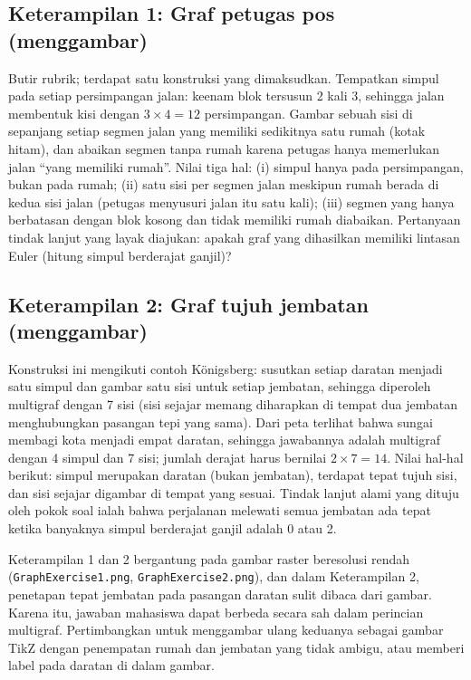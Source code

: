 \subsection*{Keterampilan 1: Graf petugas pos (menggambar)}

Butir rubrik; terdapat satu konstruksi yang dimaksudkan. Tempatkan simpul pada setiap persimpangan jalan: keenam blok tersusun 2 kali 3, sehingga jalan membentuk kisi dengan $3 \times 4 = 12$ persimpangan. Gambar sebuah sisi di sepanjang setiap segmen jalan yang memiliki sedikitnya satu rumah (kotak hitam), dan abaikan segmen tanpa rumah karena petugas hanya memerlukan jalan ``yang memiliki rumah''. Nilai tiga hal: (i) simpul hanya pada persimpangan, bukan pada rumah; (ii) satu sisi per segmen jalan meskipun rumah berada di kedua sisi jalan (petugas menyusuri jalan itu satu kali); (iii) segmen yang hanya berbatasan dengan blok kosong dan tidak memiliki rumah diabaikan. Pertanyaan tindak lanjut yang layak diajukan: apakah graf yang dihasilkan memiliki lintasan Euler (hitung simpul berderajat ganjil)?

\subsection*{Keterampilan 2: Graf tujuh jembatan (menggambar)}

Konstruksi ini mengikuti contoh K\"onigsberg: susutkan setiap daratan menjadi satu simpul dan gambar satu sisi untuk setiap jembatan, sehingga diperoleh multigraf dengan 7 sisi (sisi sejajar memang diharapkan di tempat dua jembatan menghubungkan pasangan tepi yang sama). Dari peta terlihat bahwa sungai membagi kota menjadi empat daratan, sehingga jawabannya adalah multigraf dengan 4 simpul dan 7 sisi; jumlah derajat harus bernilai $2 \times 7 = 14$. Nilai hal-hal berikut: simpul merupakan daratan (bukan jembatan), terdapat tepat tujuh sisi, dan sisi sejajar digambar di tempat yang sesuai. Tindak lanjut alami yang dituju oleh pokok soal ialah bahwa perjalanan melewati semua jembatan ada tepat ketika banyaknya simpul berderajat ganjil adalah 0 atau 2.

\begin{qaflag}
Keterampilan 1 dan 2 bergantung pada gambar raster beresolusi rendah (\texttt{GraphExercise1.png}, \texttt{GraphExercise2.png}), dan dalam Keterampilan 2, penetapan tepat jembatan pada pasangan daratan sulit dibaca dari gambar. Karena itu, jawaban mahasiswa dapat berbeda secara sah dalam perincian multigraf. Pertimbangkan untuk menggambar ulang keduanya sebagai gambar TikZ dengan penempatan rumah dan jembatan yang tidak ambigu, atau memberi label pada daratan di dalam gambar.
\end{qaflag}

